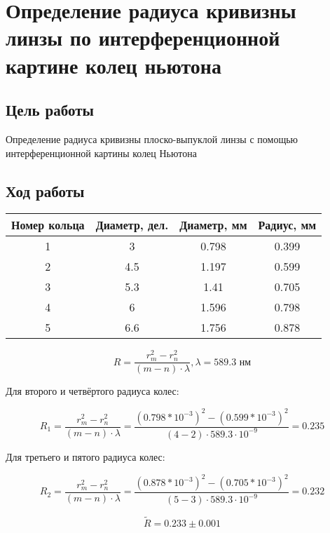\chapter{Определение радиуса кривизны линзы по интерференционной картине колец ньютона}

\section{Цель работы}

Определение радиуса кривизны плоско-выпуклой линзы с
помощью интерференционной картины колец Ньютона

\section{Ход работы}

\begin{table}[H]
	\begin{tabular}{|c|c|c|c|}
		\hline
		Номер кольца & Диаметр, дел. & Диаметр, мм & Радиус, мм\\ \hline
		1 & 3 & 0.798 & 0.399 \\ \hline
		2 & 4.5 & 1.197 & 0.599 \\ \hline
		3 & 5.3 & 1.41 & 0.705 \\ \hline
		4 & 6 & 1.596 & 0.798\\ \hline
		5 & 6.6 & 1.756 & 0.878 \\ \hline 
	\end{tabular}
\end{table}

\[
R = \frac{r_m^2-r_n^2}{(m-n) \cdot \lambda}, \lambda = 589.3 \text{ нм}
\]

Для второго и четвёртого радиуса колес:

\[
R_1 = \frac{r_m^2-r_n^2}{(m-n) \cdot \lambda} = \frac{(0.798*10^{-3})^2-(0.599*10^{-3})^2}{(4-2) \cdot 589.3 \cdot 10^{-9}}= 0.235
\]

Для третьего и пятого радиуса колес:

\[
R_2 = \frac{r_m^2-r_n^2}{(m-n) \cdot \lambda} = \frac{(0.878*10^{-3})^2-(0.705*10^{-3})^2}{(5-3) \cdot 589.3 \cdot 10^{-9}}= 0.232
\]

\[
\widetilde{R} = 0.233 \pm 0.001
\]
